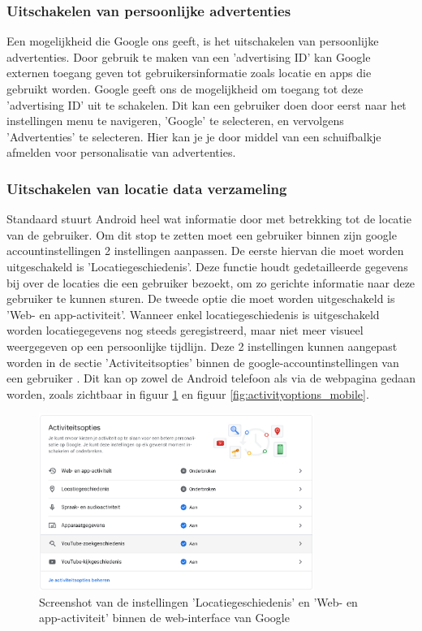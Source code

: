 \subsubsection{Uitschakelen van persoonlijke advertenties}
Een mogelijkheid die Google ons geeft, is het uitschakelen van persoonlijke advertenties. Door gebruik te maken van een 'advertising ID' kan Google externen toegang geven tot gebruikersinformatie zoals locatie en apps die gebruikt worden. Google geeft ons de mogelijkheid om toegang tot deze 'advertising ID' uit te schakelen. Dit kan een gebruiker doen door eerst naar het instellingen menu te navigeren, 'Google' te selecteren, en vervolgens 'Advertenties' te selecteren. Hier kan je je door middel van een schuifbalkje afmelden voor personalisatie van advertenties. \autocite{knight_degoogle}

\subsubsection{Uitschakelen van locatie data verzameling}
Standaard stuurt Android heel wat informatie door met betrekking tot de locatie van de gebruiker. Om dit stop te zetten moet een gebruiker binnen zijn google accountinstellingen 2 instellingen aanpassen. De eerste hiervan die moet worden uitgeschakeld is 'Locatiegeschiedenis'. Deze functie houdt gedetailleerde gegevens bij over de locaties die een gebruiker bezoekt, om zo gerichte informatie naar deze gebruiker te kunnen sturen. De tweede optie die moet worden uitgeschakeld is 'Web- en app-activiteit'. Wanneer enkel locatiegeschiedenis is uitgeschakeld worden locatiegegevens nog steeds geregistreerd, maar niet meer visueel weergegeven op een persoonlijke tijdlijn. Deze 2 instellingen kunnen aangepast worden in de sectie 'Activiteitsopties' binnen de google-accountinstellingen van een gebruiker \autocite{stolzoff_tracking-location-data}. Dit kan op zowel de Android telefoon als via de webpagina gedaan worden, zoals zichtbaar in figuur \ref{fig:activityoptions} en figuur \ref{fig:activityoptions_mobile}.

\begin{figure}
    \centering
    \includegraphics[width=0.8\textwidth]{img/activiteitsopties.png}
    \caption{Screenshot van de instellingen 'Locatiegeschiedenis' en 'Web- en app-activiteit' binnen de web-interface van Google}
    \label{fig:activityoptions}
\end{figure}

